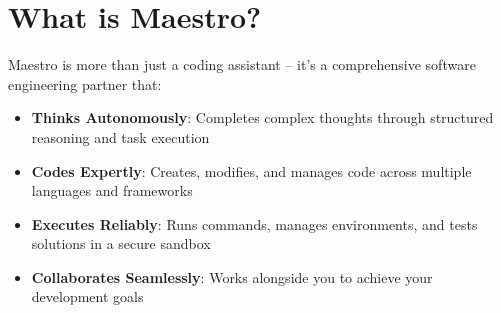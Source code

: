 \section*{\color{maestroBlue}What is Maestro?}

Maestro is more than just a coding assistant – it's a comprehensive software engineering partner that:

\begin{itemize}
    \item \textbf{Thinks Autonomously}: Completes complex thoughts through structured reasoning and task execution
    \item \textbf{Codes Expertly}: Creates, modifies, and manages code across multiple languages and frameworks
    \item \textbf{Executes Reliably}: Runs commands, manages environments, and tests solutions in a secure sandbox
    \item \textbf{Collaborates Seamlessly}: Works alongside you to achieve your development goals
\end{itemize}